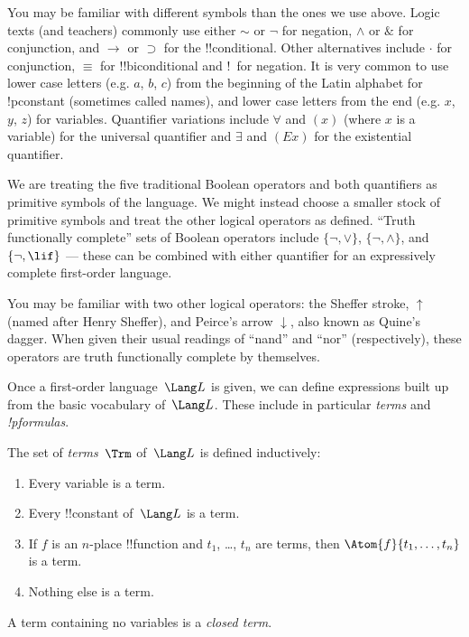 \documentclass[../../include/open-logic-section]{subfiles}
\begin{document}

\begin{intro}
You may be familiar with different symbols than the ones we use
above. Logic texts (and teachers) commonly use either $\sim$ or $\neg$
for negation, $\wedge$ or $\&$ for conjunction, and $\rightarrow$ or
$\supset$ for the !!{conditional}. Other alternatives include $\cdot$ for
conjunction, $\equiv$ for !!{biconditional} and !~for negation. It is very
common to use lower case letters (e.g. $a$, $b$, $c$) from the
beginning of the Latin alphabet for !p{constant} (sometimes called
names), and lower case letters from the end (e.g. $x$, $y$, $z$)
for variables. Quantifier variations include $\forall$ and $(x)$
(where $x$ is a variable) for the universal quantifier and
$\exists$ and $(Ex)$ for the existential quantifier.
\end{intro}


\begin{wordy}
We are treating the five traditional Boolean operators and both 
quantifiers as primitive symbols of the language. We might instead 
choose a smaller stock of primitive symbols and treat the other logical 
operators as defined. ``Truth functionally complete'' sets of Boolean 
operators include $\{ \lnot, \lor \}$, $\{ \lnot, \land \}$, and $\{ \lnot, \lif\}$ 
--- these can be combined with either quantifier for an expressively 
complete first-order language.

You may be familiar with two other logical operators: the Sheffer stroke, $\uparrow$ (named after Henry Sheffer), and Peirce's arrow $\downarrow$, also known as Quine's dagger. When given their usual readings of ``nand'' and ``nor'' (respectively), these operators are truth functionally complete by themselves.

Once a first-order language~$\Lang L$ is given, we can define
expressions built up from the basic vocabulary of~$\Lang L$.  These
include in particular \emph{terms} and \emph{!p{formulas}}.
\end{wordy}

\begin{defn}[Term]
The set of \emph{terms}~$\Trm$ of~$\Lang L$ is
defined inductively:
\begin{enumerate}
\item Every variable is a term.
\item Every !!{constant} of~$\Lang L$ is a term.
\item If $f$ is an $n$-place !!{function} and $t_1$, \dots, $t_n$
  are terms, then $\Atom{f}{t_1, \ldots, t_n}$ is a term.
\item Nothing else is a term.
\end{enumerate}
A term containing no variables is a \emph{closed term}.
\end{defn}
\end{document}
